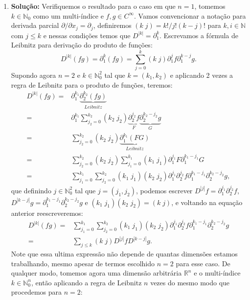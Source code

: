 \documentclass{article}
\begin{document}
\begin{enumerate}
		\item \textbf{Solução:} Verifiquemos o resultado para o caso em que $n =1$, tomemos $k \in \mathbb{N}_{0}$ como um multi-índice e $f, g \in C^{\infty}$. Vamos convencionar a notação para derivada parcial $\partial/\partial {x_{j}} = \partial_{j}$, definiremos $(k \; j) = k!/j!(k-j)!$ para $k, i \in \mathbb{N}$ com $j \leq k$  e nessas condições temos que $D^{|k|} = \partial^{k}_{1}$. Escrevamos a fórmula de Leibnitz para derivação do produto de funções:
		$$
		D^{|k|} (fg)
		= \partial^{k}_{1} (fg) = \sum_{j=0}^{k} (k \; j)\partial_{1}^{j}f \partial_{1}^{k-j}g.
		$$
		Supondo agora $n = 2$ e $k \in \mathbb{N}^{2}_{0}$ tal que $k = (k_{1}, k_{2})$ e aplicando 2 vezes a regra de Leibnitz para o produto de funções, teremos:
		$$
		\begin{aligned}
		D^{|k|} (fg)
		= & \partial^{k_1}_{1} \underbrace{ \partial^{k_2}_{2} (fg) }_{Leibnitz}  \\
		= & \partial^{k_1}_{1} \sum_{j_{2}=0}^{k_{2}} (k_{2} \; j_{2}) \underbrace{ \partial_{2}^{j_{2}}f }_{F} \underbrace{ \partial_{2}^{k_{2}-j_{2}}g }_{G} \\
		= & \sum_{j_{2}=0}^{k_{2}} (k_{2} \; j_{2}) \underbrace{ \partial^{k_1}_{1} (F G) }_{Leibnitz} \\
		= & \sum_{j_{2}=0}^{k_{2}} (k_{2} \; j_{2}) \sum_{j_{1}=0}^{k_{1}} (k_{1} \; j_{1}) \partial_{1}^{j_{1}}F \partial_{1}^{k_{1}-j_{1}}G  \\
		= & \sum_{j_{1}=0}^{k_{1}} \sum_{j_{2}=0}^{k_{2}} (k_{1} \; j_{1})(k_{2} \; j_{2}) \partial_{1}^{j_{1}} \partial_{2}^{j_{2}}f \partial_{1}^{k_{1}-j_{1}} \partial_{2}^{k_{2}-j_{2}}g,
		\end{aligned}
		$$
		que definindo $j \in \mathbb{N}^{2}_{0}$ tal que $j = (j_{1}, j_{2})$, podemos escrever $D^{|j|} f = \partial_{1}^{j_{1}} \partial_{2}^{j_{2}}f$, $D^{|k - j|} g = \partial_{1}^{k_{1}-j_{1}} \partial_{2}^{k_{2}-j_{2}}g$ e $(k_{1} \; j_{1})(k_{2} \; j_{2}) = (k \; j)$, e voltando na equação anterior reescreveremos:
		$$
		\begin{aligned}
		D^{|k|} (fg)
		= & \sum_{j_{1}=0}^{k_{1}} \sum_{j_{2}=0}^{k_{2}} (k_{1} \; j_{1})(k_{2} \; j_{2}) \partial_{1}^{j_{1}} \partial_{2}^{j_{2}}f \partial_{1}^{k_{1}-j_{1}} \partial_{2}^{k_{2}-j_{2}}g \\
		= & \sum_{j \leq k} (k \; j) D^{|j|}f D^{|k-j|}g.
		\end{aligned}
		$$
		Note que essa ultima expressão não depende de quantas dimensões estamos trabalhando, mesmo apesar de termos escolhido $n=2$ para esse caso. De qualquer modo, tomemos agora uma dimensão arbitrária $\mathbb{R}^{n}$ e o multi-índice $k \in \mathbb{N}^{n}_{0}$, então aplicando a regra de Leibnitz $n$ vezes do mesmo modo que procedemos para $n=2$:

\end{enumerate}
\end{document}
